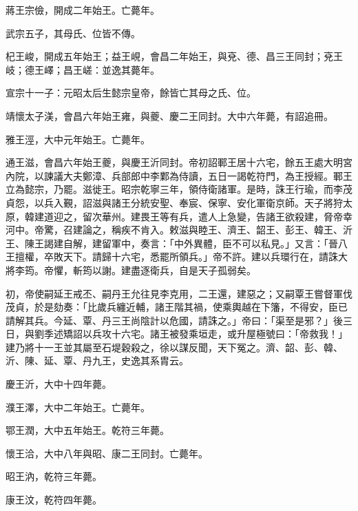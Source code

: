 \begin{pinyinscope}
 蔣王宗儉，開成二年始王。亡薨年。



 武宗五子，其母氏、位皆不傳。



 杞王峻，開成五年始王；益王峴，會昌二年始王，與兗、德、昌三王同封；兗王岐；德王嶧；昌王嵯：並逸其薨年。



 宣宗十一子：元昭太后生懿宗皇帝，餘皆亡其母之氏、位。



 靖懷太子渼，會昌六年始王雍，與夔、慶二王同封。大中六年薨，有詔追冊。



 雅王涇，大中元年始王。亡薨年。



 通王滋，會昌六年始王夔，與慶王沂同封。帝初詔鄆王居十六宅，餘五王處大明宮內院，以諫議大夫鄭漳、兵部郎中李鄴為侍讀，五日一謁乾符門，為王授經。鄆王立為懿宗，乃罷。滋徙王。昭宗乾寧三年，領侍衛諸軍。是時，誅王行瑜，而李茂貞怨，以兵入覲，詔滋與諸王分統安聖、奉宸、保寧、安化軍衛京師。天子將狩太原，韓建道迎之，留次華州。建畏王等有兵，遣人上急變，告諸王欲殺建，脅帝幸河中。帝驚，召建論之，稱疾不肯入。敕滋與睦王、濟王、韶王、彭王、韓王、沂王、陳王謁建自解，建留軍中，奏言：「中外異體，臣不可以私見。」又言：「晉八王擅權，卒敗天下。請歸十六宅，悉罷所領兵。」帝不許。建以兵環行在，請誅大將李筠。帝懼，斬筠以謝。建盡逐衛兵，自是天子孤弱矣。



 初，帝使嗣延王戒丕、嗣丹王允往見李克用，二王還，建惡之；又嗣覃王嘗督軍伐茂貞，於是劾奏：「比歲兵纏近輔，諸王階其禍，使乘輿越在下籓，不得安，臣已請解其兵。今延、覃、丹三王尚陰計以危國，請誅之。」帝曰：「渠至是邪？」後三日，與劉季述矯詔以兵攻十六宅。諸王被發乘垣走，或升屋極號曰：「帝救我！」建乃將十一王並其屬至石堤穀殺之，徐以謀反聞，天下冤之。濟、韶、彭、韓、沂、陳、延、覃、丹九王，史逸其系胄云。



 慶王沂，大中十四年薨。



 濮王澤，大中二年始王。亡薨年。



 鄂王潤，大中五年始王。乾符三年薨。



 懷王洽，大中八年與昭、康二王同封。亡薨年。



 昭王汭，乾符三年薨。



 康王汶，乾符四年薨。




\end{pinyinscope}
